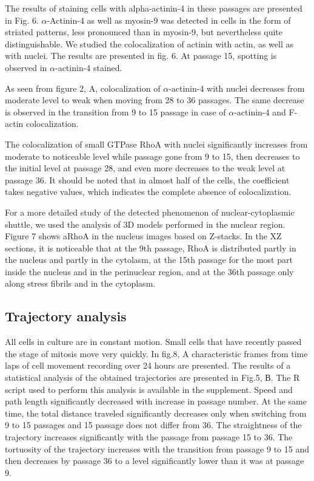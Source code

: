 \documentclass[alpha-refs]{wiley-article}
\begin{document}
The results of staining cells with alpha-actinin-4 in these passages are presented in Fig. 6.
$\alpha$-Actinin-4 as well as myosin-9 was detected in cells in the form of striated patterns, less pronounced than in myosin-9, but nevertheless quite distinguishable.
We studied the colocalization of actinin with actin, as well as with nuclei.
The results are presented in fig. 6.
At passage 15, spotting is observed in $\alpha$-actinin-4 stained.


As seen from figure 2, A, colocalization of $\alpha$-actinin-4 with nuclei decreases from moderate level to weak when moving from 28 to 36 passages.
The same decrease is observed in the transition from 9 to 15 passage in case of $\alpha$-actinin-4 and F-actin colocalization.


The colocalization of small GTPase RhoA with nuclei significantly increases from moderate to noticeable level while passage gone from 9 to 15, then decreases to the initial level at passage 28, and even more decreases to the weak level at passage 36.
It should be noted that in almost half of the cells, the coefficient takes negative values, which indicates the complete absence of colocalization.


For a more detailed study of the detected phenomenon of nuclear-cytoplasmic shuttle, we used the analysis of 3D models performed in the nuclear region.
Figure 7 shows aRhoA in the nucleus images based on Z-stacks.
In the XZ sections, it is noticeable that at the 9th passage, RhoA is distributed partly in the nucleus and partly in the cytolasm, at the 15th passage for the most part inside the nucleus and in the perinuclear region, and at the 36th passage only along stress fibrils and in the cytoplasm.

\subsection{Trajectory analysis}

All cells in culture are in constant motion.
Small cells that have recently passed the stage of mitosis move very quickly.
In fig.8, A characteristic frames from time laps of cell movement recording over 24 hours are presented.
The results of a statistical analysis of the obtained trajectories are presented in Fig.5, В.
The R script used to perform this analysis is available in the supplement.
Speed and path length significantly decreased with increase in passage number.
At the same time, the total distance traveled significantly decreases only when switching from 9 to 15 passages and 15 passage does not differ from 36.
The straightness of the trajectory increases significantly with the passage from passage 15 to 36.
The tortuosity of the trajectory increases with the transition from passage 9 to 15 and then decreases by passage 36 to a level significantly lower than it was at passage 9.
\end{document}
